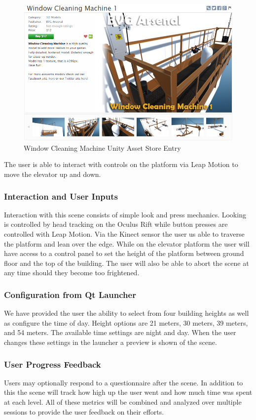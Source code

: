 \documentclass[a4paper,10pt]{article}
\begin{document}
\begin{figure}[H] %
	\centerline {\includegraphics[scale = 0.50]{elevator.png}}
	\caption{Window Cleaning Machine Unity Asset Store Entry}
	\label{fig:elevator}
\end{figure}
The user is able to interact with controls on the platform via Leap Motion to move the elevator up and down.
\subsubsection{Interaction and User Inputs}
Interaction with this scene consists of simple look and press mechanics. Looking is controlled by head tracking on the Oculus Rift while button presses are controlled with Leap Motion. Via the Kinect sensor the user us able to traverse the platform and lean over the edge. While on the elevator platform the user will have access to a control panel to set the height of the platform between ground floor and the top of the building. The user will also be able to abort the scene at any time should they become too frightened. 

\subsubsection{Configuration from Qt Launcher}
We have provided the user the ability to select from four building heights as well as configure the time of day. Height options are 21 meters, 30 meters, 39 meters, and 54 meters. The available time settings are night and day. When the user changes these settings in the launcher a preview is shown of the scene.

\subsubsection{User Progress Feedback}
Users may optionally respond to a questionnaire after the scene. In addition to this the scene will track how high up the user went and how much time was spent at each level. All of these metrics will be combined and analyzed over multiple sessions to provide the user feedback on their efforts.
\end{document}
